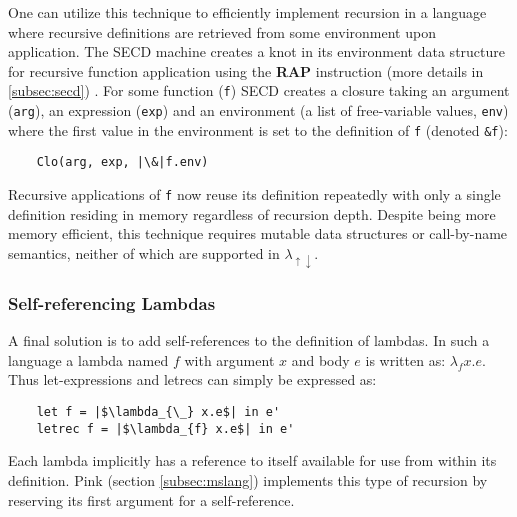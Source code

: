 \documentclass[a4paper,12pt,twoside,openright]{report}
\theoremstyle{definition}
\newcommand{\mslang}{$\lambda_{\uparrow\downarrow}$}
\begin{document}
One can utilize this technique to efficiently implement recursion in a language where recursive definitions are retrieved from some environment upon application. The SECD machine creates a knot in its environment data structure for recursive function application using the \textbf{RAP} instruction (more details in \ref{subsec:secd}) \cite{paulson1995foundations}. For some function (\texttt{f}) SECD creates a closure taking an argument (\texttt{arg}), an expression (\texttt{exp}) and an environment (a list of free-variable values, \texttt{env}) where the first value in the environment is set to the definition of \texttt{f} (denoted \texttt{\&f}):
\begin{verbatim}
    Clo(arg, exp, |\&|f.env)
\end{verbatim}
Recursive applications of \texttt{f} now reuse its definition repeatedly with only a single definition residing in memory regardless of recursion depth. Despite being more memory efficient, this technique requires mutable data structures or call-by-name semantics, neither of which are supported in \mslang.

\subsubsection{Self-referencing Lambdas}
A final solution is to add self-references to the definition of lambdas. In such a language a lambda named $f$ with argument $x$ and body $e$ is written as: $\lambda_f x.e$. Thus let-expressions and letrecs can simply be expressed as:
\begin{verbatim}
    let f = |$\lambda_{\_} x.e$| in e'
    letrec f = |$\lambda_{f} x.e$| in e'
\end{verbatim}
Each lambda implicitly has a reference to itself available for use from within its definition. Pink (section \ref{subsec:mslang}) implements this type of recursion by reserving its first argument for a self-reference.
\end{document}

